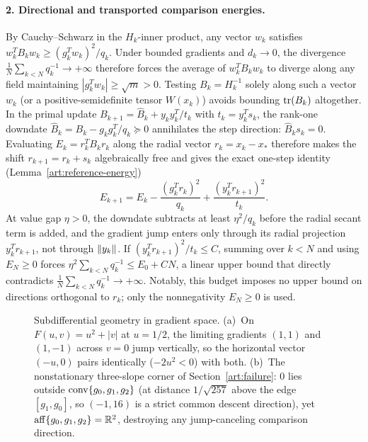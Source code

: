 \paragraph{2. Directional and transported comparison energies.}
By Cauchy--Schwarz in the $H_k$-inner product, any vector $w_k$ satisfies
$w_k^TB_kw_k\ge(g_k^Tw_k)^2/q_k$. Under bounded gradients and $d_k\to0$, the
divergence $\frac1N\sum_{k<N}q_k^{-1}\to+\infty$ therefore forces the average of
$w_k^TB_kw_k$ to diverge along any field maintaining $|g_k^Tw_k|\ge\sqrt m>0$.
Testing $B_k=H_k^{-1}$ solely along such a vector $w_k$ (or a
positive-semidefinite tensor $W(x_k)$) avoids bounding $\operatorname{tr}(B_k)$ altogether.
In the primal update $B_{k+1}=\widehat B_k+y_ky_k^T/t_k$ with $t_k=y_k^Ts_k$,
the rank-one downdate $\widehat B_k=B_k-g_kg_k^T/q_k\succeq0$ annihilates the
step direction: $\widehat B_ks_k=0$. Evaluating $E_k=r_k^TB_kr_k$ along the
radial vector $r_k=x_k-x_*$ therefore makes the shift $r_{k+1}=r_k+s_k$
algebraically free and gives the exact one-step identity
(Lemma~\ref{art:reference-energy})
\[
 E_{k+1}=E_k-\frac{(g_k^Tr_k)^2}{q_k}+\frac{(y_k^Tr_{k+1})^2}{t_k}.
\]
At value gap $\eta>0$, the downdate subtracts at least $\eta^2/q_k$ before the
radial secant term is added, and the gradient jump enters only through its
radial projection $y_k^Tr_{k+1}$, not through $\lVert y_k\rVert$. If
$(y_k^Tr_{k+1})^2/t_k\le C$, summing over $k<N$ and using $E_N\ge0$ forces
$\eta^2\sum_{k<N}q_k^{-1}\le E_0+CN$, a linear upper bound that directly
contradicts $\frac1N\sum_{k<N}q_k^{-1}\to+\infty$. Notably, this budget imposes
no upper bound on directions orthogonal to $r_k$; only the nonnegativity
$E_N\ge0$ is used.

\begin{figure}[tbp]
\centering

\caption{Subdifferential geometry in gradient space. (a)~On $F(u,v)=u^2+|v|$ at
$u=1/2$, the limiting gradients $(1,1)$ and $(1,-1)$ across $v=0$ jump
vertically, so the horizontal vector $(-u,0)$ pairs identically ($-2u^2<0$)
with both. (b)~The nonstationary three-slope corner of Section~\ref{art:failure}:
$0$ lies outside $\operatorname{conv}\{g_0,g_1,g_2\}$ (at distance $1/\sqrt{257}$ above the
edge $[g_1,g_0]$, so $(-1,16)$ is a strict common descent direction), yet
$\operatorname{aff}\{g_0,g_1,g_2\}=\mathbb R^2$, destroying any jump-canceling comparison direction.}
\label{art:gradient-geometry}
\end{figure}

